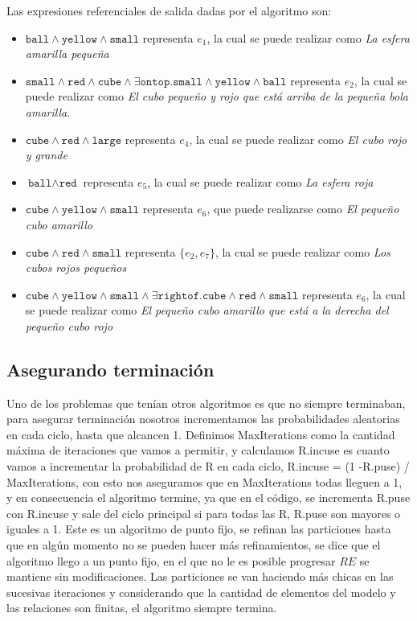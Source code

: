 Las expresiones referenciales de salida dadas por el algoritmo son:
\begin{itemize}
\item $\texttt{ball} \wedge \texttt{yellow} \wedge \texttt{small}$ representa $e_1$, la cual se puede realizar como \textit{La esfera amarilla peque\~na} 
\item $\texttt{small} \wedge \texttt{red} \wedge \texttt{cube} \wedge \exists \texttt{ontop}. \texttt{small} \wedge \texttt{yellow} \wedge \texttt{ball}$ representa $e_2$, la cual se puede realizar como \textit{El cubo peque\~no y rojo que est\'a arriba de la peque\~na bola amarilla}.
\item $\texttt{cube} \wedge \texttt{red} \wedge \texttt{large}$ representa $e_4$, la cual se puede realizar como \textit{El cubo rojo y grande} 
\item $\texttt{ball} \wedge \texttt{red}$ representa $e_5$, la cual se puede realizar como \textit{La esfera roja} 
\item $\texttt{cube} \wedge \texttt{yellow} \wedge \texttt{small}$ representa $e_6$, que puede realizarse como \textit{El peque\~no cubo amarillo} 
\item $\texttt{cube} \wedge \texttt{red} \wedge \texttt{small}$ representa $\{e_2,e_7\}$, la cual se puede realizar como \textit{Los cubos rojos peque\~nos}  
\item $\texttt{cube} \wedge \texttt{yellow} \wedge \texttt{small} \wedge \exists \texttt{rightof}. \texttt{cube} \wedge \texttt{red} \wedge \texttt{small}$ representa $e_6$, la cual se puede realizar como \textit{El peque\~no cubo amarillo que est\'a a la derecha del peque\~no cubo rojo} 
 
\end{itemize}


\subsection{Asegurando terminaci\'on}

Uno de los problemas que ten\'ian otros algoritmos es que no siempre terminaban, para asegurar terminaci\'on nosotros incrementamos las probabilidades aleatorias en cada ciclo, hasta que alcancen 1. Definimos MaxIterations como la cantidad m\'axima de iteraciones que vamos a permitir, y calculamos R.incuse es cuanto vamos a incrementar la probabilidad de R en cada ciclo, R.incuse = (1 -R.puse) / MaxIterations, con esto nos aseguramos que en MaxIterations todas lleguen a 1, y en consecuencia el algoritmo termine, ya que en el c\'odigo, se incrementa R.puse con R.incuse y sale del ciclo principal si para todas las R, R.puse son mayores o iguales a 1.
Este es un algoritmo de punto fijo, se refinan las particiones hasta que en alg\'un momento no se pueden hacer m\'as refinamientos, se dice que el algoritmo llego a un punto fijo, en el que no le es posible progresar $RE$ se mantiene sin modificaciones. Las particiones se van haciendo m\'as chicas en las sucesivas iteraciones y considerando que la cantidad de elementos del modelo y las relaciones son finitas, el algoritmo siempre termina.

